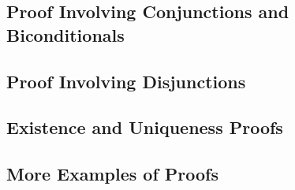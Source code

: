 \documentclass{article}
\begin{document}
\subsection{Proof Involving Conjunctions and Biconditionals} 
\subsection{Proof Involving Disjunctions} 
\subsection{Existence and Uniqueness Proofs}
\subsection{More Examples of Proofs}


\clearpage
\printglossary[type=\acronymtype,style=long]  %
\printglossary[type=symbolslist,style=long]   %
\printglossary[type=main]                     %
\end{document}
